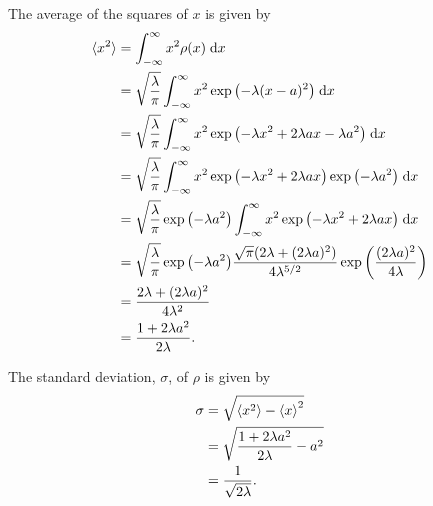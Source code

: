 \documentclass[a4paper, 12pt]{config/homework}
\begin{document}
\begin{enumerate}
\begin{enumerate}[label=(\alph*)]
The average of the squares of \(x\) is given by
\begin{align*}
\braket{x^2} &= \bint{-\infty}{\infty}{x^2 \rho(x)}{x}
\\&= \sqrt{\frac{\lambda}{\pi}} \bint{-\infty}{\infty}{x^2 \exp{\left(-\lambda(x-a)^2\right)}}{x}
\\&= \sqrt{\frac{\lambda}{\pi}} \bint{-\infty}{\infty}{x^2 \exp{\left(-\lambda x^2 +2\lambda ax - \lambda a^2\right)}}{x}
\\&= \sqrt{\frac{\lambda}{\pi}} \bint{-\infty}{\infty}{x^2 \exp{\left(-\lambda x^2 + 2\lambda a x\right)}\exp{\left(-\lambda a^2\right)}}{x}
\\&= \sqrt{\frac{\lambda}{\pi}} \exp{\left(-\lambda a^2\right)} \bint{-\infty}{\infty}{x^2 \exp{\left(-\lambda x^2 + 2\lambda a x\right)}}{x}
\\&= \sqrt{\frac{\lambda}{\pi}} \exp{\left(-\lambda a^2\right)} \frac{\sqrt{\pi} (2\lambda + (2\lambda a)^2)}{4 \lambda^{5/2}} \exp{\left(\frac{(2\lambda a)^2}{4\lambda}\right)}
\\&= \frac{2\lambda + (2\lambda a)^2}{4\lambda^2}
\\&= \frac{1 + 2\lambda a^2}{2\lambda}.
\end{align*}

The standard deviation, \(\sigma \), of \(\rho \) is given by
\begin{align*}
\sigma &= \sqrt{\braket{x^2} - \braket{x}^2}
\\&= \sqrt{\frac{1 + 2\lambda a^2}{2\lambda} - a^2}
\\&= \frac{1}{\sqrt{2\lambda}}.
\end{align*}
\end{enumerate}


\end{enumerate}
\end{document}
